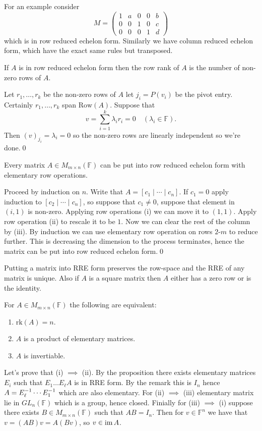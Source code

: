 \documentclass{article}
\newcommand{\F}{\mathbb{F}}
\newcommand{\rk}{\mathrm{rk}}
\newcommand{\Row}{\mathrm{Row}}
\begin{document}
For an example consider
\[
  M=\begin{pmatrix}
	  1 & a & 0 & 0 & b\\
	  0 & 0 & 1 & 0 & c\\
	  0 & 0 & 0 & 1 & d
  \end{pmatrix}
\]
which is in row reduced echelon form. Similarly we have column reduced echelon form, which have the exact same rules but transposed.
\begin{lemma}
  If $ A $ is in row reduced echelon form then the row rank of $ A $ is the number of non-zero rows of $ A $.
\end{lemma}
\pf Let $ r_1,\dots, r_k $ be the non-zero rows of $ A $ let $ j_i=P(v_i) $ be the pivot entry. Certainly $ r_1,\dots, r_k $ span $ \Row(A) $. Suppose that
\[
	v=\sum_{i=1}^k\lambda_ir_i=0\quad (\lambda_i\in\F).
\]
Then $ (v)_{j_i} =\lambda_i=0 $ so the non-zero rows are linearly independent so we're done.\qed
\begin{proposition}
	Every matrix $ A \in M_{m\times n}(\F) $ can be put into row reduced echelon form with elementary row operations.
\end{proposition}
\pf Proceed by induction on $ n $. Write that $ A=\left[c_1\mid \cdots \mid c_n\right] $. If $ c_1=0 $ apply induction to $ [c_2\mid \cdots \mid c_n] $, so suppose that $ c_1\ne 0 $, suppose that element in $ (i,1) $ is non-zero. Applying row operations (i) we can move it to $ (1,1) $.  Apply row operation (ii) to rescale it to be $ 1 $. Now we can clear the rest of the column by (iii). By induction we can use elementary row operation on rows $ 2$-$ m $ to reduce further. This is decreasing the dimension to the process terminates, hence the matrix can be put into row reduced echelon form.\qed
\begin{remark}
  Putting a matrix into RRE form preserves the row-space and the RRE of any matrix is unique. Also if $ A $ is a square matrix then $ A $ either has a zero row or is the identity. 
\end{remark}
\begin{theorem}
	For $ A\in M_{m\times n}(\F) $ the following are equivalent:
	\begin{enumerate}
		\item $ \rk (A)=n $.
		\item $ A $ is a product of elementary matrices.
		\item $ A $ is invertiable.
	\end{enumerate}
\end{theorem}
\pf Let's prove that (i) $ \implies $ (ii). By the proposition there exists elementary matrices $ E_i $ such that $ E_1\dots E_\ell A $ is in RRE form. By the remark this is $ I_n $ hence $ A={E}^{-1}_\ell\cdots {E}^{-1}_1 $ which are also elementary. For (ii) $ \implies $ (iii) elementary matrix lie in $ GL_n(\F) $ which is a group, hence closed. Finially for (iii) $ \implies $ (i) suppose there exists $ B\in M_{m\times n}(\F) $ such that $ AB=I_n $. Then for $ v\in \F^n $ we have that $ v=(AB)v=A(Bv) $, so $ v\in \operatorname{im} A $.
\end{document}
